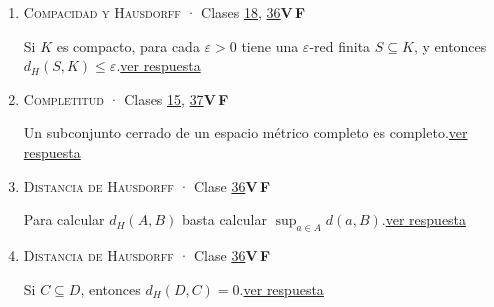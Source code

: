 \documentclass[11pt,a4paper]{article}
\begin{document}
\begin{enumerate}[leftmargin=2.2em,itemsep=8pt,label=\textbf{\arabic*.}]
\item[\hyperlink{r-5}{\textbf{5.}}] \hypertarget{q-5}{}{\small \textsc{Compacidad y Hausdorff} · Clases \href{https://decostruttivismo.github.io/MAT2514-repaso/pdf/MAT2514_apuntes_completos.pdf\#nameddest=section.18}{18}, \href{https://decostruttivismo.github.io/MAT2514-repaso/pdf/MAT2514_apuntes_completos.pdf\#nameddest=section.36}{36}}\hfill \textbf{V}\,\fbox{\rule{0pt}{6pt}\hspace{6pt}}\quad\textbf{F}\,\fbox{\rule{0pt}{6pt}\hspace{6pt}}\par Si $K$ es compacto, para cada $\varepsilon\gt 0$ tiene una $\varepsilon$-red finita $S\subseteq K$, y entonces $d_H(S,K)\le\varepsilon$.\hfill{\footnotesize\hyperlink{r-5}{ver respuesta}}
\item[\hyperlink{r-6}{\textbf{6.}}] \hypertarget{q-6}{}{\small \textsc{Completitud} · Clases \href{https://decostruttivismo.github.io/MAT2514-repaso/pdf/MAT2514_apuntes_completos.pdf\#nameddest=section.15}{15}, \href{https://decostruttivismo.github.io/MAT2514-repaso/pdf/MAT2514_apuntes_completos.pdf\#nameddest=section.37}{37}}\hfill \textbf{V}\,\fbox{\rule{0pt}{6pt}\hspace{6pt}}\quad\textbf{F}\,\fbox{\rule{0pt}{6pt}\hspace{6pt}}\par Un subconjunto cerrado de un espacio métrico completo es completo.\hfill{\footnotesize\hyperlink{r-6}{ver respuesta}}
\item[\hyperlink{r-7}{\textbf{7.}}] \hypertarget{q-7}{}{\small \textsc{Distancia de Hausdorff} · Clase \href{https://decostruttivismo.github.io/MAT2514-repaso/pdf/MAT2514_apuntes_completos.pdf\#nameddest=section.36}{36}}\hfill \textbf{V}\,\fbox{\rule{0pt}{6pt}\hspace{6pt}}\quad\textbf{F}\,\fbox{\rule{0pt}{6pt}\hspace{6pt}}\par Para calcular $d_H(A,B)$ basta calcular $\sup_{a\in A}d(a,B)$.\hfill{\footnotesize\hyperlink{r-7}{ver respuesta}}
\item[\hyperlink{r-8}{\textbf{8.}}] \hypertarget{q-8}{}{\small \textsc{Distancia de Hausdorff} · Clase \href{https://decostruttivismo.github.io/MAT2514-repaso/pdf/MAT2514_apuntes_completos.pdf\#nameddest=section.36}{36}}\hfill \textbf{V}\,\fbox{\rule{0pt}{6pt}\hspace{6pt}}\quad\textbf{F}\,\fbox{\rule{0pt}{6pt}\hspace{6pt}}\par Si $C\subseteq D$, entonces $d_H(D,C)=0$.\hfill{\footnotesize\hyperlink{r-8}{ver respuesta}}

\end{enumerate}
\end{document}
